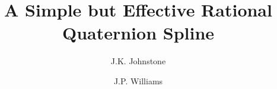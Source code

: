 \newif\ifFull
\Fullfalse

\SingleSpace

\setlength{\oddsidemargin}{0pt}
\setlength{\topmargin}{0in}	%
\setlength{\textheight}{8.5in}
\setlength{\textwidth}{6.5in}
\setlength{\columnsep}{5mm}	%

\title{A Simple but Effective Rational Quaternion Spline}
\author{J.K. Johnstone \and J.P. Williams}


\maketitle


